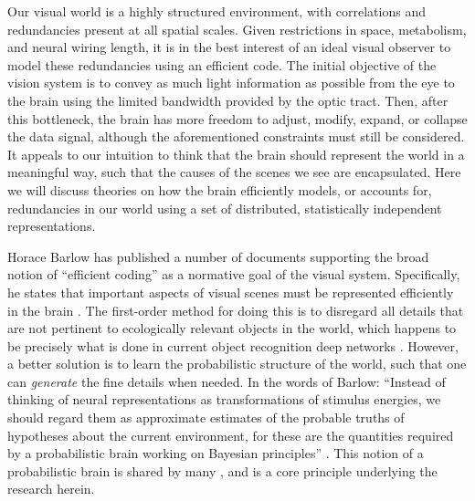 Our visual world is a highly structured environment, with correlations and redundancies present at all spatial scales. Given restrictions in space, metabolism, and neural wiring length, it is in the best interest of an ideal visual observer to model these redundancies using an efficient code. The initial objective of the vision system is to convey as much light information as possible from the eye to the brain using the limited bandwidth provided by the optic tract. Then, after this bottleneck, the brain has more freedom to adjust, modify, expand, or collapse the data signal, although the aforementioned constraints must still be considered. It appeals to our intuition to think that the brain should represent the world in a meaningful way, such that the causes of the scenes we see are encapsulated. Here we will discuss theories on how the brain efficiently models, or accounts for, redundancies in our world using a set of distributed, statistically independent representations.


Horace Barlow has published a number of documents supporting the broad notion of ``efficient coding'' as a normative goal of the visual system. Specifically, he states that important aspects of visual scenes must be represented efficiently in the brain \parencite{barlow2001redundancy}. The first-order method for doing this is to disregard all details that are not pertinent to ecologically relevant objects in the world, which happens to be precisely what is done in current object recognition deep networks \parencite{tishby2015deep}. However, a better solution is to learn the probabilistic structure of the world, such that one can \textit{generate} the fine details when needed. In the words of Barlow: ``Instead of thinking of neural representations as transformations of stimulus energies, we should regard them as approximate estimates of the probable truths of hypotheses about the current environment, for these are the quantities required by a probabilistic brain working on Bayesian principles'' \parencite{barlow2001redundancy}. This notion of a probabilistic brain is shared by many \parencite{kersten2004object, lee2003hierarchical, lewicki1997bayesian, olshausen2013perception}, and is a core principle underlying the research herein.

